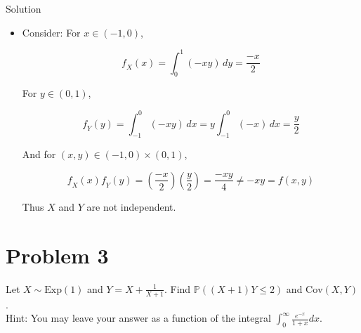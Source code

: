 \begin{qlsolution}{Solution}
\begin{itemize}
  On \((1,2) \times ( - 1,0)\),

  \[- \int_{1}^{2}\int_{- 1}^{0}\mathit{x}^{2}\mathit{y}^{2}\,\mathit{d}\mathit{y}\,\mathit{d}\mathit{x} = - \left( {\int_{1}^{2}\mathit{x}^{2}\,\mathit{d}\mathit{x}} \right)\left( {\int_{- 1}^{0}\mathit{y}^{2}\,\mathit{d}\mathit{y}} \right) = - \left( \frac{7}{3} \right)\left( \frac{1}{3} \right) = - \frac{7}{9}\]

  Thus,

  \[\mathbb{E}\lbrack\mathit{X}\mathit{Y}\rbrack = - \frac{1}{9} - \frac{7}{9} = - \frac{8}{9}\]
\item
  Consider: For \(\mathit{x} \in ( - 1,0)\),

  \[\mathit{f}_{\mathit{X}}(\mathit{x}) = \int_{0}^{1}( - \mathit{x}\mathit{y})\,\mathit{d}\mathit{y} = \frac{- \mathit{x}}{2}\]

  For \(\mathit{y} \in (0,1)\),

  \[\mathit{f}_{\mathit{Y}}(\mathit{y}) = \int_{- 1}^{0}( - \mathit{x}\mathit{y})\,\mathit{d}\mathit{x} = \mathit{y}\int_{- 1}^{0}( - \mathit{x})\,\mathit{d}\mathit{x} = \frac{\mathit{y}}{2}\]

  And for \((\mathit{x},\mathit{y}) \in ( - 1,0) \times (0,1)\),

  \[\mathit{f}_{\mathit{X}}(\mathit{x})\mathit{f}_{\mathit{Y}}(\mathit{y}) = \left( \frac{- \mathit{x}}{2} \right)\left( \frac{\mathit{y}}{2} \right) = \frac{- \mathit{x}\mathit{y}}{4} \neq - \mathit{x}\mathit{y} = \mathit{f}(\mathit{x},\mathit{y})\]

  Thus \(\mathit{X}\) and \(\mathit{Y}\) are not independent.
\end{itemize}

\end{qlsolution}

\section{Problem 3}\label{hw03-problem-3}

Let \(\mathit{X} \sim \text{Exp}(1)\) and \(\mathit{Y} = \mathit{X} + \frac{1}{\mathit{X} + 1}\). Find \(\mathbb{P}((\mathit{X} + 1)\mathit{Y} \leq 2)\) and \(\text{Cov}(\mathit{X},\mathit{Y})\).\\
Hint: You may leave your answer as a function of the integral \(\int_{0}^{\infty}\frac{\mathit{e}^{- \mathit{x}}}{1 + \mathit{x}}\mathit{d}\mathit{x}\).

